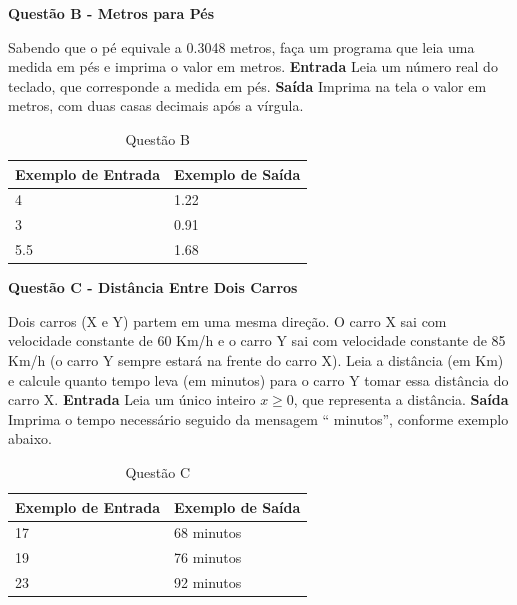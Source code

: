 \documentclass[a4paper, 12pt]{article}
\begin{document}
\newpage %
\begin{center}
\textbf{{\Large Questão B - Metros para Pés}}
\end{center}
\vspace{5pt}
Sabendo que o pé equivale a 0.3048 metros, faça um programa que leia uma medida em pés e imprima o valor
em metros.
\newline \newline
\textbf{{\large Entrada}} \newline
Leia um número real do teclado, que corresponde a medida em pés.
\newline \newline
\textbf{{\large Saída}} \newline
Imprima na tela o valor em metros, com duas casas decimais após a vírgula.
\newline
\begin{table}[H]
	\centering
	\begin{tabular}{|l|l|}
	\hline
	\textbf{Exemplo de Entrada} & \textbf{Exemplo de Saída} \\ \hline
	4 & 1.22 \\ \hline
	3 & 0.91 \\ \hline
	5.5 & 1.68 \\ \hline
	\end{tabular}
	\caption{Questão B}
	\label{tabela2}
\end{table}

\newpage %
\begin{center}
\textbf{{\Large Questão C - Distância Entre Dois Carros}}
\end{center}
\vspace{5pt}
Dois carros (X e Y) partem em uma mesma direção. O carro X sai com velocidade constante de 60 Km/h e o carro Y sai com velocidade constante de 85 Km/h (o carro Y sempre estará na frente do carro X). \newline
Leia a distância (em Km) e calcule quanto tempo leva (em minutos) para o carro Y tomar essa distância do carro X.
\newline \newline
\textbf{{\large Entrada}} \newline
Leia um único inteiro $x \geq 0$, que representa a distância.
\newline \newline
\textbf{{\large Saída}} \newline
Imprima o tempo necessário seguido da mensagem `` minutos'', conforme exemplo abaixo.
\newline
\begin{table}[H]
	\centering
	\begin{tabular}{|l|l|}
	\hline
	\textbf{Exemplo de Entrada} & \textbf{Exemplo de Saída} \\ \hline
	17 & 68 minutos \\ \hline
	19 & 76 minutos \\ \hline
	23 & 92 minutos \\ \hline
	\end{tabular}
	\caption{Questão C}
	\label{tabela3}
\end{table}
\end{document}
